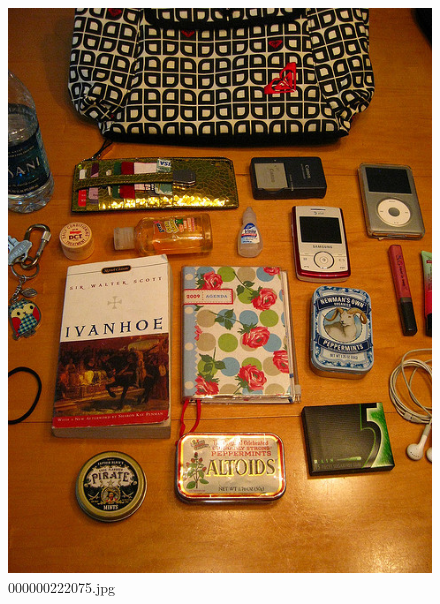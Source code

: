 \begin{figure}[h]
    \centering
    \includegraphics[width=0.8\linewidth]{../image set/hard/000000222075.jpg}
    \caption{000000222075.jpg}
\end{figure}
